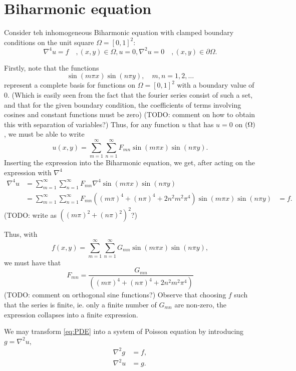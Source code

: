 \section{Biharmonic equation}
\label{sec:PDE}

Consider teh inhomogeneous Biharmonic equation with clamped boundary conditions on the unit square $\Omega = [0, 1]^2$:
\begin{subequations}\label{eq:PDE}
  \begin{equation}
    \nabla^4 u = f \quad, (x, y) \in \Omega,
  \end{equation}
  \begin{equation}
    u = 0, \nabla^2u = 0 \quad, (x, y) \in \partial\Omega.
  \end{equation}
\end{subequations}

Firstly, note that the functions
$$
\sin(m \pi x) \sin(n \pi y), \quad m,n = 1, 2, \dots
$$
represent a complete basis for functions on $\Omega = [0, 1]^2$ with a boundary value of 0.
(Which is easily seen from the fact that the fourier series consist of such a set, and that for the given boundary condition, the coefficients of terms involving cosines and constant functions must be zero)
(TODO: comment on how to obtain this with separation of variables?)
Thus, for any function $u$ that has $u = 0$ on $\del\Omega$, we must be able to write
$$
u(x, y) =
\sum_{m=1}^\infty
\sum_{n=1}^\infty
F_{mn}
\sin(m\pi x)
\sin(n\pi y).
$$
Inserting the expression into the Biharmonic equation, we get, after acting on the expression with $\nabla^4$
\begin{align}
  \nabla^4 u &=
  \sum_{m=1}^\infty
  \sum_{n=1}^\infty
  F_{mn}
  \nabla^4
  \sin(m\pi x)\sin(n\pi y)\\
  &=
  \sum_{m=1}^\infty
  \sum_{n=1}^\infty
  F_{mn}
  \left(
  (m\pi)^4 + (n\pi)^4 + 2n^2m^2\pi^4
  \right)
  \sin(m\pi x)\sin(n\pi y)
  &= f.
\end{align}
(TODO: write as $((m\pi)^2+(n\pi)^2)^2$?)

Thus, with
$$
f(x, y)
=
\sum_{m=1}^\infty
\sum_{n=1}^\infty
G_{mn}
\sin(m\pi x)\sin(n\pi y),
$$
we must have that
$$
F_{mn} =
\frac{
  G_{mn}
}{
  \left(
  (m\pi)^4 + (n\pi)^4 + 2n^2m^2\pi^4
  \right)
}
$$
(TODO: comment on orthogonal sine functions?)
Observe that choosing $f$ such that the series is finite, ie. only a finite number of $G_{mn}$ are non-zero, the expression collapses into a finite expression.


We may transform \eqref{eq:PDE} into a system of Poisson equation by introducing $g = \nabla^2 u$,
\begin{align}\label{eq:PDE-poisson}
  \nabla^2g &= f,\\
  \nabla^2u &= g.
\end{align}


